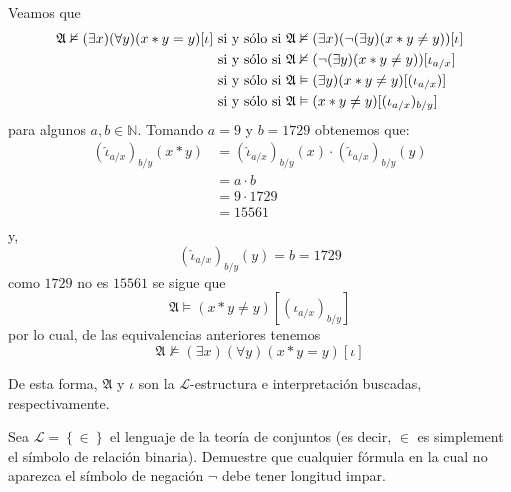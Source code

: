 \documentclass[12pt]{article}
\newcounter{it}
\theoremstyle{largebreak}
\begin{document}
\begin{sol}
        Veamos que
        \begin{equation*}
            \begin{split}
                \mathfrak{A}\nvDash(\exists x)(\forall y)(x*y=y)[\iota]&\textup{ si y sólo si }\mathfrak{A}\nvDash(\exists x)(\neg(\exists y)(x*y\neq y))[\iota]\\
                &\textup{ si y sólo si }\mathfrak{A}\nvDash(\neg(\exists y)(x*y\neq y))[\iota_{a/x}]\\
                &\textup{ si y sólo si }\mathfrak{A}\vDash(\exists y)(x*y\neq y)[(\iota_{a/x})]\\
                &\textup{ si y sólo si }\mathfrak{A}\vDash(x*y\neq y)[(\iota_{a/x})_{b/y}]\\
            \end{split}
        \end{equation*}
        para algunos $a,b\in\mathbb{N}$. Tomando $a=9$ y $b=1729$ obtenemos que:
        \begin{equation*}
            \begin{split}
                (\hat{\iota}_{a/x})_{b/y}(x*y)&=(\hat{\iota}_{a/x})_{b/y}(x)\cdot(\hat{\iota}_{a/x})_{b/y}(y)\\
                &=a\cdot b\\
                &=9\cdot 1729\\
                &=15561\\
            \end{split}
        \end{equation*}
        y,
        \begin{equation*}
            (\hat{\iota}_{a/x})_{b/y}(y)=b=1729
        \end{equation*}
        como $1729$ no es $15561$ se sigue que
        \begin{equation*}
            \mathfrak{A}\vDash(x*y\neq y)[(\iota_{a/x})_{b/y}]
        \end{equation*}
        por lo cual, de las equivalencias anteriores tenemos
        \begin{equation*}
            \mathfrak{A}\nvDash(\exists x)(\forall y)(x*y=y)[\iota]
        \end{equation*}
        
        De esta forma, $\mathfrak{A}$ y $\iota$ son la $\mathcal{L}$-estructura e interpretación buscadas, respectivamente.
    \end{sol}

    \begin{excer}
        Sea $\mathcal{L}=\left\{\in\right\}$ el lenguaje de la teoría de conjuntos (es decir, $\in$ es simplement el símbolo de relación binaria). Demuestre que cualquier fórmula en la cual no aparezca el símbolo de negación $\neg$ debe tener longitud impar.
    \end{excer}
\end{document}

